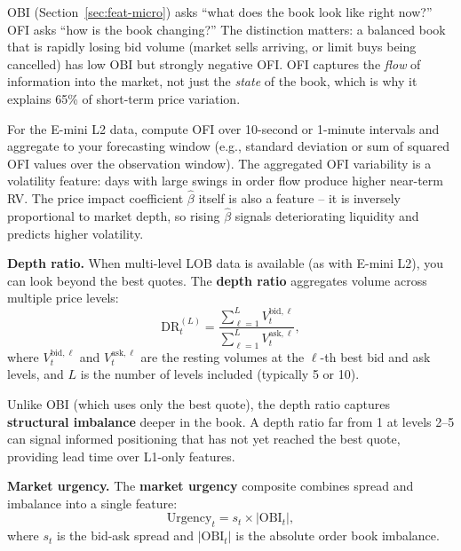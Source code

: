\begin{intuition}
OBI (Section~\ref{sec:feat-micro}) asks ``what does the book look like right now?''
OFI asks ``how is the book changing?''
The distinction matters: a balanced book that is rapidly losing bid volume (market sells arriving, or limit buys being cancelled) has low OBI but strongly negative OFI.
OFI captures the \emph{flow} of information into the market, not just the \emph{state} of the book, which is why it explains 65\% of short-term price variation.
\end{intuition}

\begin{projectconnection}
For the E-mini L2 data, compute OFI over 10-second or 1-minute intervals and aggregate to your forecasting window (e.g., standard deviation or sum of squared OFI values over the observation window).
The aggregated OFI variability is a volatility feature: days with large swings in order flow produce higher near-term RV.
The price impact coefficient $\hat{\beta}$ itself is also a feature -- it is inversely proportional to market depth, so rising $\hat{\beta}$ signals deteriorating liquidity and predicts higher volatility.
\end{projectconnection}

\textbf{Depth ratio.}
When multi-level LOB data is available (as with E-mini L2), you can look beyond the best quotes.
The \textbf{depth ratio} aggregates volume across multiple price levels:
\begin{equation}\label{eq:depth-ratio}
\text{DR}_t^{(L)} = \frac{\sum_{\ell=1}^{L} V_t^{\text{bid},\ell}}{\sum_{\ell=1}^{L} V_t^{\text{ask},\ell}},
\end{equation}
where $V_t^{\text{bid},\ell}$ and $V_t^{\text{ask},\ell}$ are the resting volumes at the $\ell$-th best bid and ask levels, and $L$ is the number of levels included (typically 5 or 10).

Unlike OBI (which uses only the best quote), the depth ratio captures \textbf{structural imbalance} deeper in the book.
A depth ratio far from 1 at levels 2--5 can signal informed positioning that has not yet reached the best quote, providing lead time over L1-only features.

\textbf{Market urgency.}
The \textbf{market urgency} composite combines spread and imbalance into a single feature:
\begin{equation}\label{eq:market-urgency}
\text{Urgency}_t = s_t \times |\text{OBI}_t|,
\end{equation}
where $s_t$ is the bid-ask spread and $|\text{OBI}_t|$ is the absolute order book imbalance.

